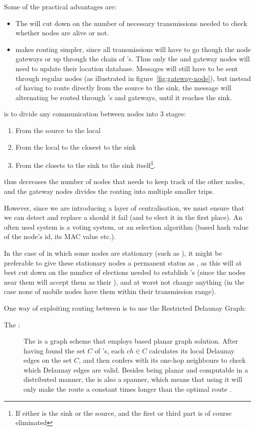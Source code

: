 Some of the practical advantages are:
\begin{itemize}
\item The \ch will cut down on the number of necessary transmissions needed to check whether nodes are alive or not.
\item \ch makes routing simpler, since all transmissions will have to go though the node gateways or up through the chain of \ch's. Thus only the \ch and gateway nodes will need to update their location database. Messages will still have to be sent through regular nodes (as illustrated in figure~\ref{fig:gateway-node}), but instead of having to route directly from the source to the sink, the message will alternating be routed through \ch's and gateways, until it reaches the sink.
\end{itemize}

\ch is to divide any communication between nodes into 3 stages:
\begin{enumerate}
\item From the source to the local \ch 
\item From the local \ch to the \ch closest to the sink
\item From the \ch closets to the sink to the sink itself\footnote{If either \ch is the sink or the source, and the first or third part is of course eliminated}.
\end{enumerate}
 \ch thus decreases the number of nodes that needs to keep track of the other nodes, and the gateway nodes divides the routing into multiple smaller trips.  

However, since we are introducing a layer of centralisation, we must ensure that we can detect and replace a \ch should it fail (and to elect it in the first place). An often used system is a voting system, or an selection algorithm (based hash value of the node's id, its MAC value etc.).

In the case of \manet in which some nodes are stationary (such as \cite{two-tier}), it might be preferable to give these stationary nodes a permanent status as \ch, as this will at best cut down on the number of elections needed to establish \ch's (since the nodes near them will accept them as their \ch), and at worst not change anything (in the case none of mobile nodes have them within their transmission range).

One way of exploiting routing between \ch is to use the Restricted Delaunay Graph:
\begin{description}
\item[The \rdg:] The \rdg is a graph scheme that employs \ch based planar graph solution. After having found the set $C$ of \ch's, each $ch \in C$ calculates its local Delaunay edges on the set $C$, and then confers with its one-hop \ch neighbours to check which Delaunay edges are valid. Besides being planar and computable in a distributed manner, the \rdg is also a spanner, which means that using it will only make the route a constant times longer than the optimal route \cite{GeoSpanners}.
\end{description}

